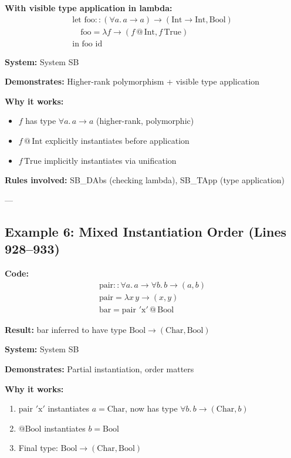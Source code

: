 \documentclass[11pt,a4paper]{article}
\begin{document}
\textbf{With visible type application in lambda:}
\[
\begin{array}{l}
\text{let foo} :: (\forall a.\, a \to a) \to (\text{Int} \to \text{Int}, \text{Bool}) \\
\quad \text{foo} = \lambda f \to (f \,@\,\text{Int}, f\, \text{True}) \\
\text{in foo id}
\end{array}
\]

\textbf{System:} System SB

\textbf{Demonstrates:} Higher-rank polymorphism + visible type application

\textbf{Why it works:}
\begin{itemize}
\item $f$ has type $\forall a.\, a \to a$ (higher-rank, polymorphic)
\item $f \,@\,\text{Int}$ explicitly instantiates before application
\item $f\, \text{True}$ implicitly instantiates via unification
\end{itemize}

\textbf{Rules involved:} SB\_DAbs (checking lambda), SB\_TApp (type application)

---

\subsection{Example 6: Mixed Instantiation Order (Lines 928--933)}

\textbf{Code:}
\[
\begin{array}{l}
\text{pair} :: \forall a.\, a \to \forall b.\, b \to (a, b) \\
\text{pair} = \lambda x\, y \to (x, y) \\[6pt]
\text{bar} = \text{pair } '\text{x}' \,@\,\text{Bool}
\end{array}
\]

\textbf{Result:} bar inferred to have type $\text{Bool} \to (\text{Char}, \text{Bool})$

\textbf{System:} System SB

\textbf{Demonstrates:} Partial instantiation, order matters

\textbf{Why it works:}
\begin{enumerate}
\item $\text{pair } '\text{x}'$ instantiates $a = \text{Char}$, now has type $\forall b.\, b \to (\text{Char}, b)$
\item $@\text{Bool}$ instantiates $b = \text{Bool}$
\item Final type: $\text{Bool} \to (\text{Char}, \text{Bool})$
\end{enumerate}
\end{document}
